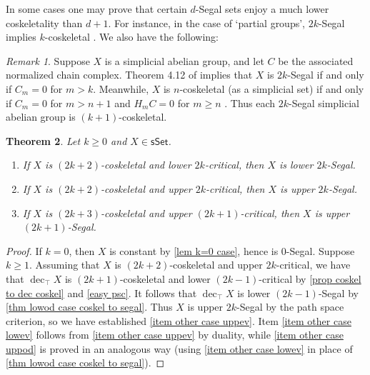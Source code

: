 \documentclass{amsart}
\newcommand{\sset}{\mathsf{sSet}}
\newcommand{\dectop}{\operatorname{dec}_\top}
\newtheorem{theorem}{Theorem}
\theoremstyle{definition}
\theoremstyle{remark}
\newtheorem{remark}[theorem]{Remark}
\begin{document}
In some cases one may prove that certain $d$-Segal sets enjoy a much lower coskeletality than $d+1$. 
For instance, in the case of `partial groups', $2k$-Segal implies $k$-coskeletal \cite[Theorem 6.6]{Hackney:PGSO}.
We also have the following:

\begin{remark}
Suppose $X$ is a simplicial abelian group, and let $C$ be the associated normalized chain complex.
Theorem 4.12 of  \cite{DyckerhoffJassoWalde:SSHART} implies that $X$ is $2k$-Segal if and only if $C_m = 0$ for $m > k$. 
Meanwhile, $X$ is $n$-coskeletal (as a simplicial set) if and only if $C_m = 0$ for $m > n+1$ and $H_mC = 0$ for $m\geq n$ \cite[\href{https://kerodon.net/tag/0528}{Tag 0528}]{kerodon}.
Thus each $2k$-Segal simplicial abelian group is $(k{+}1)$-coskeletal.
\end{remark}

\begin{theorem}\label{thm other cases coskel to segal}
Let $k \geq 0$ and $X\in \sset$.
\begin{enumerate}
\item If $X$ is $(2k{+}2)$-coskeletal and lower $2k$-critical, 
then $X$ is lower $2k$-Segal.\label{item other case lowev}
\item If $X$ is $(2k{+}2)$-coskeletal and upper $2k$-critical, 
then $X$ is upper $2k$-Segal.\label{item other case uppev}
\item If $X$ is $(2k{+}3)$-coskeletal and upper $(2k{+}1)$-critical, 
then $X$ is upper $(2k{+}1)$-Segal.\label{item other case uppod}
\end{enumerate}
\end{theorem}
\begin{proof}
If $k = 0$, then $X$ is constant by \cref{lem k=0 case}, hence is $0$-Segal. Suppose $k \geq 1$.
Assuming that $X$ is $(2k{+}2)$-coskeletal and 
upper $2k$-critical, 
we have that $\dectop X$ is $(2k{+}1)$-coskeletal and 
lower $(2k{-}1)$-critical
by \cref{prop coskel to dec coskel} and \cref{easy psc}.
It follows that $\dectop X$ is lower $(2k{-}1)$-Segal by \cref{thm lowod case coskel to segal}. Thus $X$ is upper $2k$-Segal by the path space criterion, so we have established \eqref{item other case uppev}.
Item \eqref{item other case lowev} follows from \eqref{item other case uppev} by duality, while \eqref{item other case uppod} is proved in an analogous way (using \eqref{item other case lowev} in place of \cref{thm lowod case coskel to segal}).
\end{proof}
\end{document}
